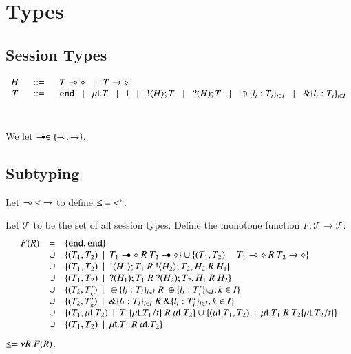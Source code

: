 \section{Types}

\subsection{Session Types}

\[
	\begin{array}{rcl}
		H &\;\;::=\;\;&	T \multimap \diamond \;\;\;|\;\;\; T \rightarrow \diamond\\
		T &\;\;::=\;\;&	\mathtt{end} \;\;\;|\;\;\; \mu\mathsf{t}.T \;\;\;|\;\;\; \mathsf{t} \;\;\;|\;\;\; ! \langle H \rangle ; T \;\;\;|\;\;\; ? (H) ; T
		\;\;\;|\;\;\;		\oplus \{l_i:T_i\}_{i \in I} \;\;\;|\;\;\; \& \{l_i:T_i\}_{i \in I}
	\end{array}
\]\

We let $\logicop \in \set{\lollipop, \sharedop}$.

\subsection{Subtyping}


\begin{definition}
	Let $\multimap\ <\ \rightarrow$ to define $\leq\ =\ <^*$.
\end{definition}

\begin{definition}
Let $\mathcal{T}$ to be the set of all session types.
Define the monotone function $F: \mathcal{T} \longrightarrow \mathcal{T}$:
%
\[
	\begin{array}{rcl}
		F(R)	& = &	\set{\tinact, \tinact}\\
			&\cup&	\set{(T_1, T_2) \setbar T_1 \logicop \diamond\ R\ T_2 \logicop \diamond}
			\cup	\set{(T_1, T_2) \setbar T_1 \lollipop \diamond\ R\ T_2 \sharedop \diamond}\\
			&\cup&	\set{(T_1, T_2) \setbar \btout{H_1} T_1\ R\ \btout{H_2} T_2, H_2\ R\ H_1}\\
			&\cup&	\set{(T_1, T_2) \setbar \btinp{H_1} T_1\ R\ \btinp{H_2} T_2, H_1\ R\ H_2}\\
			&\cup&	\set{(T_k, T'_k) \setbar \btsel{l_i: T_i}_{i \in I}\ R\ \btsel{l_i: T'_i}_{i \in I}, k \in I}\\
			&\cup&	\set{(T_k, T'_k) \setbar \btbra{l_i: T_i}_{i \in I}\ R\ \btbra{l_i: T'_i}_{i \in I}, k \in I}\\
			&\cup&	\set{(T_1, \trec{t} T_2) \setbar T_1\subst{\trec{t} T_1}{t}\ R\ \trec{t}{T_2}}
			\cup	\set{(\trec{t} T_1, T_2) \setbar \trec{t}{T_1}\ R\ T_2\subst{\trec{t} T_2}{t}}\\
			&\cup&	\set{(T_1, T_2) \setbar \trec{t} T_1\ R\ \trec{t} T_2}
	\end{array}
\]
%
$\leq = \nu R.F(R)$.
\end{definition}

